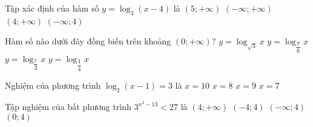 \begin{ex}%
	Tập xác định của hàm số $y=\log _3(x-4)$ là 
	\choice
		{$(5;+\infty)$}
		{$(-\infty ;+\infty)$}
		{\True $(4;+\infty)$}
		{$(-\infty ;4)$}
\end{ex}
  
\begin{ex}%
	Hàm số nào dưới đây đồng biến trên khoảng $(0;+\infty)$?
	\choice
		{\True $y={{\log }_{\sqrt{3}}}x$}
		{$y={\log }_{\dfrac{\pi }{6}}x$}
		{$y={\log }_{\dfrac{e}{3}}x$}
		{$y={\log }_{\dfrac{1}{4}}x$}
\end{ex}
  
\begin{ex}%
	Nghiệm của phương trình $\log _2(x-1)=3$ là
	\choice
		{$x=10$}
		{$x=8$}
		{\True $x=9$}
		{$x=7$}
\end{ex}
  
\begin{ex}%
	Tập nghiệm của bất phương trình $3^{x^2-13}<27$ là
	\choice
		{$(4;+\infty)$}
		{\True $(-4;4)$}
		{$(-\infty;4)$}
		{$(0;4)$}
\end{ex}
  
